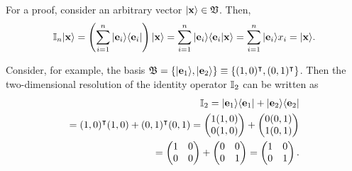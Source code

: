 {\color{OliveGreen}
\bproof

For a proof, consider an arbitrary vector $\vert {\bf x} \rangle  \in {\frak V}$.
Then,
\begin{equation}
 {\Bbb I}_n \vert {\bf x} \rangle
 =
\left(\sum_{i=1}^n \vert {\bf e}_i \rangle \langle {\bf e}_i \vert \right)
\vert {\bf x} \rangle
=
\sum_{i=1}^n \vert {\bf e}_i \rangle \langle {\bf e}_i \vert {\bf x} \rangle
=
\sum_{i=1}^n \vert {\bf e}_i \rangle  x_i
=  \vert {\bf x} \rangle
.
\end{equation}
\eproof
}


{\color{blue}
\bexample
Consider, for example, the basis
${\frak B}=\{ \vert {\bf e}_1 \rangle , \vert {\bf e}_2 \rangle \} \equiv \{(1,0)^\intercal ,(0,1)^\intercal \}$.
Then the two-dimensional resolution of the identity operator ${\Bbb I}_2$
can be written as
\begin{equation}
\begin{split}
{\Bbb I}_2 =   \vert {\bf e}_1 \rangle \langle  {\bf e}_1 \vert   +     \vert {\bf e}_2 \rangle  \langle  {\bf e}_2 \vert \\
=   (1,0)^\intercal  (1,0) +   (0,1)^\intercal  (0,1)
=
\begin{pmatrix}
1 (1,0) \\  0 (1,0)
\end{pmatrix}
 +
\begin{pmatrix}
0 (0,1)\\
1 (0,1)
\end{pmatrix} \\
 =
\begin{pmatrix}
1 & 0 \\
0 & 0
\end{pmatrix}
+
\begin{pmatrix}
0 & 0 \\
0 & 1
\end{pmatrix}
=
\begin{pmatrix}
1 & 0 \\
0 & 1
\end{pmatrix}
.
\end{split}
\end{equation}

}
